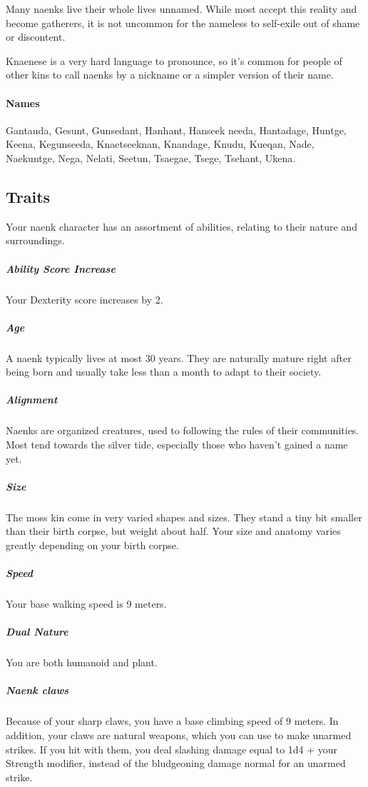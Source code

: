     Many naenks live their whole lives unnamed.
    While most accept this reality and become gatherers, it is not uncommon for the nameless to self-exile out of shame or discontent.

    Knaenese is a very hard language to pronounce, so it's common for people of other kins to call naenks by a nickname or a simpler version of their name.

    \paragraph{Names}
    Gantauda, Gesunt, Gunsedant, Hanhant, Hanseek needa, Hantadage, Huntge, Keena, Kegunseeda, Knaetseeknan, Knandage, Knudu, Kueqan, Nade, Naekuntge, Nega, Nelati, Seetun, Tsaegae, Tsege, Tsehant, Ukena.

\subsection*{Traits}
    Your naenk character has an assortment of abilities, relating to their nature and surroundings.

    \subparagraph{Ability Score Increase} Your Dexterity score increases by 2.

    \subparagraph{Age} A naenk typically lives at most 30 years.
    They are naturally mature right after being born and usually take less than a month to adapt to their society.

    \subparagraph{Alignment} Naenks are organized creatures, used to following the rules of their communities.
    Most tend towards the silver tide, especially those who haven't gained a name yet.

    \subparagraph{Size} The moss kin come in very varied shapes and sizes.
    They stand a tiny bit smaller than their birth corpse, but weight about half.
    Your size and anatomy varies greatly depending on your birth corpse. \label{kin::naenk.size}

    \subparagraph{Speed} Your base walking speed is 9 meters.

    \subparagraph{Dual Nature} You are both humanoid and plant.

    \subparagraph{Naenk claws} Because of your sharp claws, you have a base climbing speed of 9 meters.
    In addition, your claws are natural weapons, which you can use to make unarmed strikes.
    If you hit with them, you deal slashing damage equal to 1d4 + your Strength modifier, instead of the bludgeoning damage normal for an unarmed strike.

